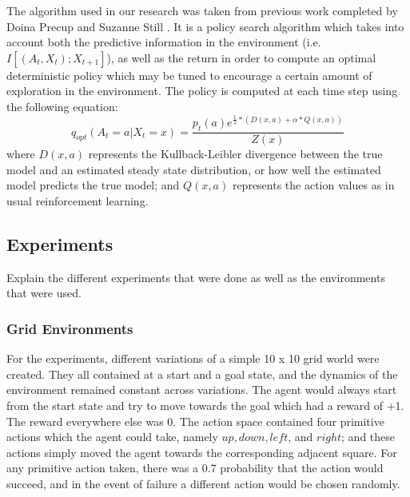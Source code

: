 \documentclass{acm_proc_article-sp}
\begin{document}

The algorithm used in our research was taken from previous work completed by Doina Precup and Suzanne Still \cite{still}. It is a policy search algorithm which takes into account both the predictive information in the environment (i.e. $I[(A_t,X_t); X_{t+1}]$), as well as the return in order to compute an optimal deterministic policy which may be tuned to encourage a certain amount of exploration in the environment. The policy is computed at each time step using the following equation: $$q_{opt}(A_t = a| X_t = x) = \frac{p_t(a)e^{\frac{1}{\lambda}*(D(x,a) + \alpha*Q(x,a))}}{Z(x)}$$ where $D(x,a)$ represents the Kullback-Leibler divergence between the true model and an estimated steady state distribution, or how well the estimated model predicts the true model; and $Q(x,a)$ represents the action values as in usual reinforcement learning.

\subsection{Experiments}

Explain the different experiments that were done as well as the environments that were used.

\subsubsection{Grid Environments}


For the experiments, different variations of a simple 10 x 10 grid world were created. They all contained at a start and a goal state, and the dynamics of the environment remained constant across variations. The agent would always start from the start state and try to move towards the goal which had a reward of +1. The reward everywhere else was 0. The action space contained four primitive actions which the agent could take, namely $up, down, left$, and $right$; and these actions simply moved the agent towards the corresponding adjacent square. For any primitive action taken, there was a 0.7 probability that the action would succeed, and in the event of failure a different action would be chosen randomly. 

\end{document}
